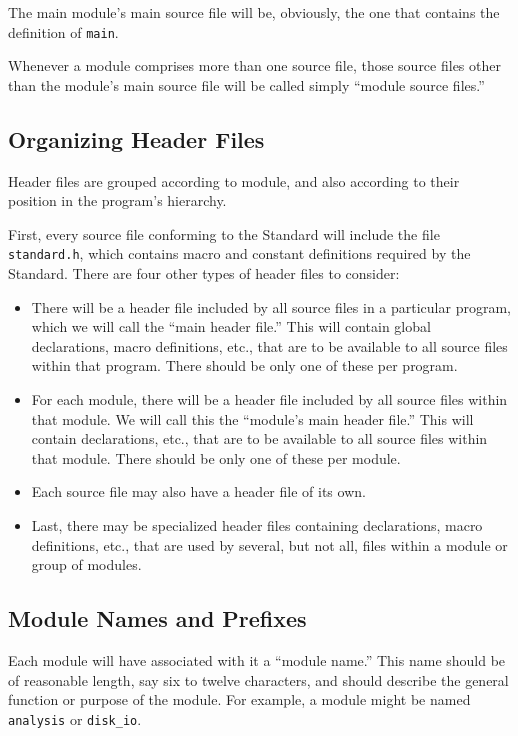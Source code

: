 The main module's main source file will be, obviously, the one that
contains the definition of {\tt main}.

Whenever a module comprises more than one source file, those source
files other than the module's main source file will be called simply
``module source files.''

\subsection{Organizing Header Files}
Header files are grouped according to module, and also according to
their position in the program's hierarchy.

First, every source file conforming to the Standard will include the
file {\tt standard.h}, which contains macro and constant definitions
required by the Standard.  There are four other types of header files
to consider:
\begin{itemize}
\item There will be a header file included by all source files in a
particular program, which we will call the ``main header file.''  This
will contain global declarations, macro definitions, etc., that are to
be available to all source files within that program.  There should be
only one of these per program.
\item For each module, there will be a header file included by all
source files within that module.  We will call this the ``module's
main header file.''  This will contain declarations, etc., that are to
be available to all source files within that module.  There should be
only one of these per module.
\item Each source file may also have a header file of its own.
\item Last, there may be specialized header files containing
declarations, macro definitions, etc., that are used by several, but
not all, files within a module or group of modules.
\end{itemize}

\subsection{Module Names and Prefixes}
Each module will have associated with it a ``module name.''  This name
should be of reasonable length, say six to twelve characters, and
should describe the general function or purpose of the module.  For
example, a module might be named {\tt analysis} or {\tt disk\_io}.

